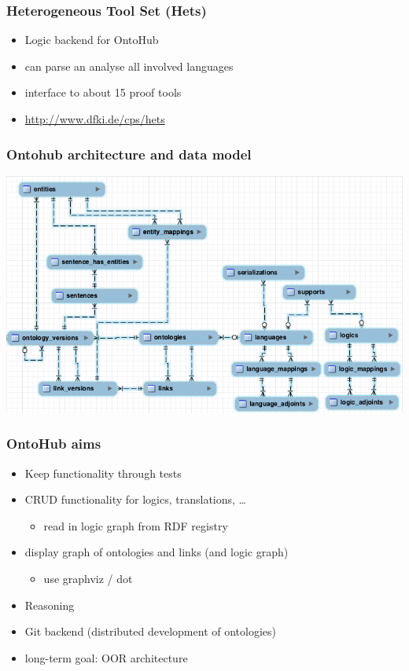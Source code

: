 \documentclass[german]{beamer}
\begin{document}
\begin{frame}
\frametitle{Heterogeneous Tool Set (Hets)}
\begin{itemize}
\item Logic backend for OntoHub
\item can parse an analyse all involved languages
\item interface to about 15 proof tools
\item \url{http://www.dfki.de/cps/hets}
\end{itemize}
\end{frame}

\begin{frame}
\frametitle{Ontohub architecture and data model}
\includegraphics[width=\textwidth]{DBVisualization.png}
\end{frame}

\begin{frame}
\frametitle{OntoHub aims}
\begin{itemize}
\item Keep functionality through tests
\item CRUD functionality for logics, translations, \ldots
\begin{itemize}
\item read in logic graph from RDF registry
\end{itemize}
\item display graph of ontologies and links (and logic graph)
\begin{itemize}
\item use graphviz / dot
\end{itemize}
\item Reasoning
\item Git backend (distributed development of ontologies)
\item long-term goal: OOR architecture
\end{itemize}
\end{frame}
\end{document}
